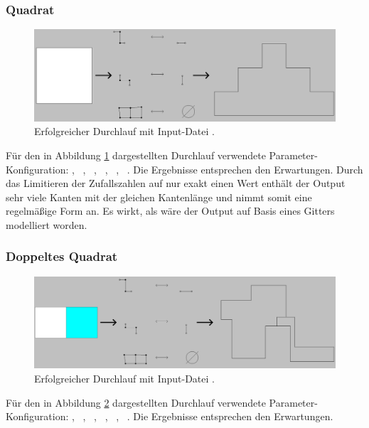 \subsubsection{Quadrat}
\begin{figure}[H]
    \centering
    \includegraphics[width=\textwidth]{images/square_success.png}
    \caption{Erfolgreicher Durchlauf mit Input-Datei .}
    \label{fig:square_success}
\end{figure}
Für den in Abbildung \ref{fig:square_success} dargestellten Durchlauf verwendete Parameter-Konfiguration: , \ , \ ,
\ , \ , \ . Die Ergebnisse entsprechen den Erwartungen. Durch das Limitieren der Zufallszahlen auf nur
exakt einen Wert enthält der Output sehr viele Kanten mit der gleichen Kantenlänge und nimmt somit eine regelmäßige Form an. Es wirkt, als wäre der Output auf
Basis eines Gitters modelliert worden.

\subsubsection{Doppeltes Quadrat}
\begin{figure}[H]
    \centering
    \includegraphics[width=\textwidth]{images/square_double_success.png}
    \caption{Erfolgreicher Durchlauf mit Input-Datei .}
    \label{fig:square_double_success}
\end{figure}
Für den in Abbildung \ref{fig:square_double_success} dargestellten Durchlauf verwendete Parameter-Konfiguration: , \ , \ ,
\ , \ , \ . Die Ergebnisse entsprechen den Erwartungen.

